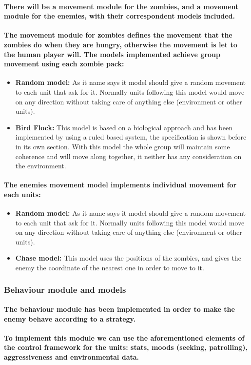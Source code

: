 \documentclass[a4paper,10pt]{article}
\newcommand{\p}[1]{\paragraph{\indent\textnormal{#1}}}
\begin{document}
      \p{There will be a movement module for the zombies, and a movement module for the enemies, with their correspondent  models included.}

      \p{The movement module for zombies defines the movement that the zombies do when they are hungry, otherwise the movement is let to the human player will. The models implemented achieve group movement using each zombie pack:}

    \begin{itemize}
      \item \textbf{Random model:} As it name says it model should give a random movement to each unit that ask for it. Normally units following this model would move on any direction without taking care of anything else (environment or other units).
      \item \textbf{Bird Flock:} This model is based on a biological approach and has been implemented by using a ruled based system, the specification is shown before in its own section. With this model the whole group will maintain some coherence and will move along together, it neither has any consideration on the environment.
    \end{itemize}

    \p{The enemies movement model implements individual movement for each units:}

    \begin{itemize}
      \item \textbf{Random model:} As it name says it model should give a random movement to each unit that ask for it. Normally units following this model would move on any direction without taking care of anything else (environment or other units).

      \item \textbf{Chase model:} This model uses the positions of the zombies, and gives the enemy the coordinate of the nearest one in order to move to it.
    \end{itemize}


    \subsubsection{Behaviour module and models}

      \p{The behaviour module has been implemented in order to make the enemy behave according to a strategy.}

      \p{To implement this module we can use the aforementioned elements of the control framework for the units: stats, moods (seeking, patrolling), aggressiveness and environmental data.}
    
\end{document}
